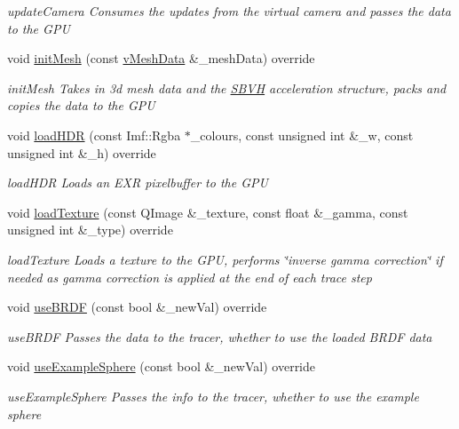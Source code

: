 \begin{DoxyCompactItemize}
\begin{DoxyCompactList}\small\item\em update\-Camera Consumes the updates from the virtual camera and passes the data to the G\-P\-U \end{DoxyCompactList}\item 
void \hyperlink{classvRendererCuda_aaad1a6c4a4ada9bbbbce2db3cfb02f32}{init\-Mesh} (const \hyperlink{structvMeshData}{v\-Mesh\-Data} \&\-\_\-mesh\-Data) override
\begin{DoxyCompactList}\small\item\em init\-Mesh Takes in 3d mesh data and the \hyperlink{classSBVH}{S\-B\-V\-H} acceleration structure, packs and copies the data to the G\-P\-U \end{DoxyCompactList}\item 
void \hyperlink{classvRendererCuda_a0994f4f68ad6973f6e80664714eb44e8}{load\-H\-D\-R} (const Imf\-::\-Rgba $\ast$\-\_\-colours, const unsigned int \&\-\_\-w, const unsigned int \&\-\_\-h) override
\begin{DoxyCompactList}\small\item\em load\-H\-D\-R Loads an E\-X\-R pixelbuffer to the G\-P\-U \end{DoxyCompactList}\item 
void \hyperlink{classvRendererCuda_a1eca8504cfb3287725cef2bbca08180f}{load\-Texture} (const Q\-Image \&\-\_\-texture, const float \&\-\_\-gamma, const unsigned int \&\-\_\-type) override
\begin{DoxyCompactList}\small\item\em load\-Texture Loads a texture to the G\-P\-U, performs \char`\"{}inverse gamma correction\char`\"{} if needed as gamma correction is applied at the end of each trace step \end{DoxyCompactList}\item 
void \hyperlink{classvRendererCuda_a8bc09351a8cd99d86d36963e430025d7}{use\-B\-R\-D\-F} (const bool \&\-\_\-new\-Val) override
\begin{DoxyCompactList}\small\item\em use\-B\-R\-D\-F Passes the data to the tracer, whether to use the loaded B\-R\-D\-F data \end{DoxyCompactList}\item 
void \hyperlink{classvRendererCuda_ab552724c473de30893fe9dc21ee2c961}{use\-Example\-Sphere} (const bool \&\-\_\-new\-Val) override
\begin{DoxyCompactList}\small\item\em use\-Example\-Sphere Passes the info to the tracer, whether to use the example sphere \end{DoxyCompactList}\item 

\end{DoxyCompactItemize}
